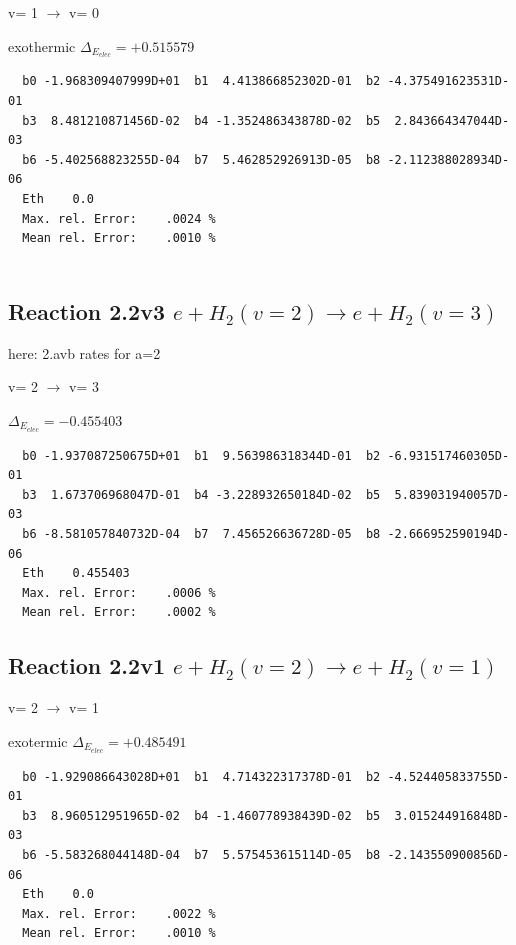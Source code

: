 \documentclass[12pt,dvipdfmx]{article}
\begin{document}
  v=  1 $\rightarrow$ v= 0

exothermic
$\Delta_{E_{elec}}=+0.515579$



\begin{small}\begin{verbatim}
  b0 -1.968309407999D+01  b1  4.413866852302D-01  b2 -4.375491623531D-01
  b3  8.481210871456D-02  b4 -1.352486343878D-02  b5  2.843664347044D-03
  b6 -5.402568823255D-04  b7  5.462852926913D-05  b8 -2.112388028934D-06
  Eth    0.0
  Max. rel. Error:    .0024 %
  Mean rel. Error:    .0010 %


\end{verbatim}\end{small}
\newpage

\subsection{
Reaction 2.2v3
$ e + H_2(v=2) \rightarrow e + H_2(v=3) $
}
here: 2.avb rates for a=2

  v=  2 $\rightarrow$ v= 3

$\Delta_{E_{elec}}=-0.455403$


\begin{small}\begin{verbatim}
  b0 -1.937087250675D+01  b1  9.563986318344D-01  b2 -6.931517460305D-01
  b3  1.673706968047D-01  b4 -3.228932650184D-02  b5  5.839031940057D-03
  b6 -8.581057840732D-04  b7  7.456526636728D-05  b8 -2.666952590194D-06
  Eth    0.455403
  Max. rel. Error:    .0006 %
  Mean rel. Error:    .0002 %

\end{verbatim}\end{small}

\subsection{
Reaction 2.2v1
$ e + H_2(v=2) \rightarrow e + H_2(v=1) $
}

  v=  2 $\rightarrow$ v= 1

exotermic
$\Delta_{E_{elec}}=+0.485491$




\begin{small}\begin{verbatim}
  b0 -1.929086643028D+01  b1  4.714322317378D-01  b2 -4.524405833755D-01
  b3  8.960512951965D-02  b4 -1.460778938439D-02  b5  3.015244916848D-03
  b6 -5.583268044148D-04  b7  5.575453615114D-05  b8 -2.143550900856D-06
  Eth    0.0
  Max. rel. Error:    .0022 %
  Mean rel. Error:    .0010 %


\end{verbatim}\end{small}
\end{document}
